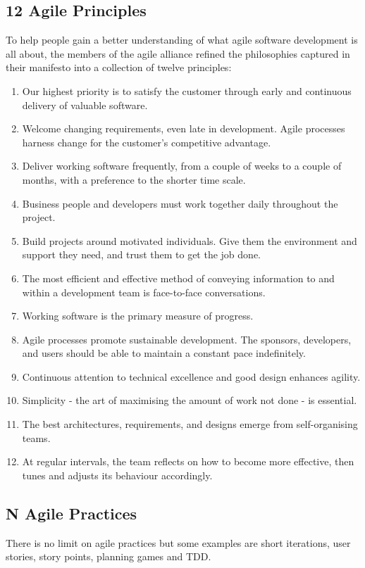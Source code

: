 \documentclass{article}
\begin{document}
\subsection{12 Agile Principles}
To help people gain a better understanding of what agile software development is all about, the members of the agile alliance refined the philosophies captured in their manifesto into a collection of twelve principles:
\begin{enumerate}
	\item Our highest priority is to satisfy the customer through early and continuous delivery of valuable software.
	\item Welcome changing requirements, even late in development. Agile processes harness change for the customer's competitive advantage.
	\item Deliver working software frequently, from a couple of weeks to a couple of months, with a preference to the shorter time scale.
	\item Business people and developers must work together daily throughout the project.
	\item Build projects around motivated individuals. Give them the environment and support they need, and trust them to get the job done.
	\item The most efficient and effective method of conveying information to and within a development team is face-to-face conversations.
	\item Working software is the primary measure of progress.
	\item Agile processes promote sustainable development. The sponsors, developers, and users should be able to maintain a constant pace indefinitely.
	\item Continuous attention to technical excellence and good design enhances agility.
	\item Simplicity - the art of maximising the amount of work not done - is essential.
	\item The best architectures, requirements, and designs emerge from self-organising teams.
	\item At regular intervals, the team reflects on how to become more effective, then tunes and adjusts its behaviour accordingly.
\end{enumerate}

\subsection{N Agile Practices}
There is no limit on agile practices but some examples are short iterations, user stories, story points, planning games and TDD.
\end{document}
